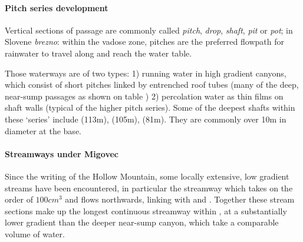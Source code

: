  


\paragraph{Pitch series development}
 Vertical sections of passage are commonly called \emph{pitch}, \emph{drop}, \emph{shaft}, \emph{pit} or \emph{pot}; in Slovene \emph{brezno}: within the vadose zone, pitches are the preferred flowpath for rainwater to travel along and reach the water table.

 Those waterways are of two types: 1) running water in high gradient canyons, which consist of short pitches linked by entrenched roof tubes (many of the deep, near-sump passages as shown on table ) 2) percolation water as thin films on shaft walls (typical of the higher pitch series). Some of the deepest shafts within these `series' include  (113m),  (105m),  (81m). They are commonly over 10m in diameter at the base. 
 



\paragraph{Streamways under Migovec} Since the writing of the Hollow Mountain, some locally extensive, low gradient streams have been encountered, in particular the  streamway which takes on the order of $100cm^3$ and flows northwards, linking with  and . Together these stream sections make up the longest continuous streamway within , at a substantially lower gradient than the deeper near-sump canyon, which take a comparable volume of water. 
 

